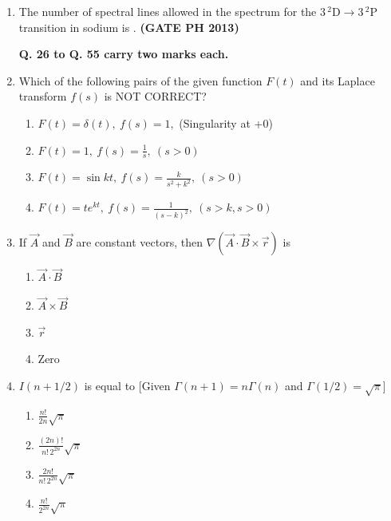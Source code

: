 \documentclass[14pt, a4paper]{extarticle}
\renewcommand{\vec}[1]{\overrightarrow{#1}}
\begin{document}
\begin{enumerate}[label=\textbf{Q. \arabic*}]
\item The number of spectral lines allowed in the spectrum for the $3\,^2\text{D} \to 3\,^2\text{P}$ transition in sodium is \underline{\hspace{5em}}.
\textbf{(GATE PH 2013)}

\vspace{1.5em}

\textbf{Q. 26 to Q. 55 carry two marks each.}

\item Which of the following pairs of the given function $F(t)$ and its Laplace transform $f(s)$ is NOT CORRECT?
\begin{enumerate}
    \item $F(t) = \delta(t),~f(s)=1,$ (Singularity at +0)
    \item $F(t) = 1,~f(s) = \frac{1}{s},~(s>0)$
    \item $F(t) = \sin kt,~f(s) = \frac{k}{s^2+k^2},~(s>0)$
    \item $F(t) = te^{kt},~f(s) = \frac{1}{(s-k)^2},~(s>k, s>0)$
\end{enumerate}

\item If $\vec{A}$ and $\vec{B}$ are constant vectors, then $\nabla(\vec{A} \cdot \vec{B} \times \vec{r})$ is
\begin{multicols}{4}
    \begin{enumerate}
        \item $\vec{A} \cdot \vec{B}$
        \item $\vec{A} \times \vec{B}$
        \item $\vec{r}$
        \item Zero
    \end{enumerate}
\end{multicols}

\item $I(n + 1/2)$ is equal to [Given $\Gamma(n+1) = n\Gamma(n)$ and $\Gamma(1/2) = \sqrt{\pi}$]
\begin{multicols}{4}
    \begin{enumerate}
        \item $\frac{n!}{2n}\sqrt{\pi}$
        \item $\frac{(2n)!}{n!\,2^{2n}}\sqrt{\pi}$
        \item $\frac{2n!}{n!\,2^{2n}}\sqrt{\pi}$
        \item $\frac{n!}{2^{2n}}\sqrt{\pi}$
    \end{enumerate}
\end{multicols}


\end{enumerate}
\end{document}
